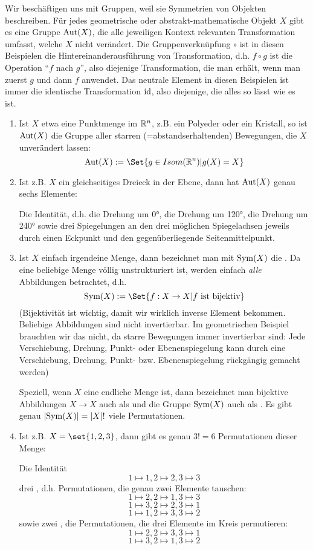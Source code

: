 \begin{example}[Symmetriegruppen]
Wir beschäftigen uns mit Gruppen, weil sie Symmetrien von Objekten beschreiben. Für jedes geometrische oder abstrakt-mathematische Objekt $X$ gibt es eine Gruppe $\operatorname{Aut}(X)$, die alle jeweiligen Kontext relevanten Transformation umfasst, welche $X$ nicht verändert. Die Gruppenverknüpfung $\circ$ ist in diesen Beispielen die Hintereinanderausführung von Transformation, d.h. $f\circ g$ ist die Operation \enquote{$f$ nach $g$}, also diejenige Transformation, die man erhält, wenn man zuerst $g$ und dann $f$ anwendet. Das neutrale Element in diesen Beispielen ist immer die identische Transformation $\operatorname{id}$, also diejenige, die alles so lässt wie es ist.

\begin{enumerate}
\item Ist $X$ etwa eine Punktmenge im $\mathbb{R}^n$, z.B. ein Polyeder oder ein Kristall, so ist $\operatorname{Aut}(X)$ die Gruppe aller starren (=abstandserhaltenden) Bewegungen, die $X$ unverändert lassen:
\[\Aut(X) := \Set{g\in Isom(\IR^n) | g(X) = X}\]
\item Ist z.B. $X$ ein gleichseitiges Dreieck in der Ebene, dann hat $\operatorname{Aut}(X)$ genau sechs Elemente:

Die Identität, d.h. die Drehung um 0°, die Drehung um 120°, die Drehung um 240° sowie drei Spiegelungen an den drei möglichen Spiegelachsen jeweils durch einen Eckpunkt und den gegenüberliegende Seitenmittelpunkt.
\item Ist $X$ einfach irgendeine Menge, dann bezeichnet man mit $\operatorname{Sym}(X)$ die . Da eine beliebige Menge völlig unstrukturiert ist, werden einfach \emph{alle} Abbildungen betrachtet, d.h.
\[\Sym(X) := \Set{f: X\to X | f\text{ ist bijektiv}}\]
(Bijektivität ist wichtig, damit wir wirklich inverse Element bekommen. Beliebige Abbildungen sind nicht invertierbar. Im geometrischen Beispiel brauchten wir das nicht, da starre Bewegungen immer invertierbar sind: Jede Verschiebung, Drehung, Punkt- oder Ebenenspiegelung kann durch eine Verschiebung, Drehung, Punkt- bzw. Ebenenspiegelung rückgängig gemacht werden)

Speziell, wenn $X$ eine endliche Menge ist, dann bezeichnet man bijektive Abbildungen $X\to X$ auch als  und die Gruppe $\operatorname{Sym}(X)$ auch als . Es gibt genau $\lvert\operatorname{Sym}(X)\rvert = \lvert X\rvert!$ viele Permutationen.

\item Ist z.B. $X=\set{1,2,3}$, dann gibt es genau $3!=6$ Permutationen dieser Menge:

Die Identität
\[1\mapsto 1, 2\mapsto 2, 3\mapsto 3\]
drei , d.h. Permutationen, die genau zwei Elemente tauschen:
\[1\mapsto 2, 2\mapsto 1, 3\mapsto 3\]
\[1\mapsto 3, 2\mapsto 2, 3\mapsto 1\]
\[1\mapsto 1, 2\mapsto 3, 3\mapsto 2\]
sowie zwei , die Permutationen, die drei Elemente im Kreis permutieren:
\[1\mapsto 2, 2\mapsto 3, 3\mapsto 1\]
\[1\mapsto 3, 2\mapsto 1, 3\mapsto 2\]
\end{enumerate}
\end{example}

